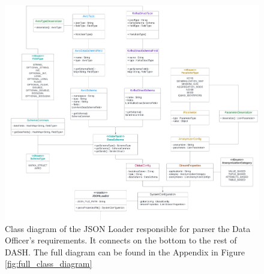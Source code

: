 \begin{figure}[H]
   \begin{adjustbox}{center}
   \includegraphics[width=0.85\pdfpagewidth]{img/Requirements_Parser_Class_Diagram.pdf}
   \end{adjustbox}
   \caption[Class diagram of the requirements parsing component of \ac{DASH}]{Class diagram of the JSON Loader responsible for parser the Data Officer's requirements. It connects on the bottom to the rest of \ac{DASH}. The full diagram can be found in the Appendix in Figure \ref{fig:full_class_diagram}\label{fig:requirements_parser}}
\end{figure}

